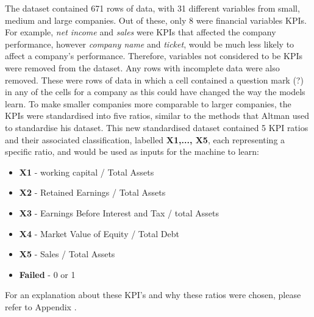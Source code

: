 \documentclass[11pt]{article}
\begin{document}
The dataset contained 671 rows of data, with 31 different variables from small, medium and large companies. Out of these, only 8 were financial variables KPIs. For example, \textit{net income} and \textit{sales} were KPIs that affected the company performance, however \textit{company name} and \textit{ticket}, would be much less likely to affect a company's performance. Therefore, variables not considered to be KPIs were removed from the dataset. Any rows with incomplete data were also removed. These were rows of data in which a cell contained a question mark (?) in any of the cells for a company as this could have changed the way the models learn. To make smaller companies more comparable to larger companies, the KPIs were standardised into five ratios, similar to the methods that Altman used to standardise his dataset. This new standardised dataset contained 5 KPI ratios and their associated classification, labelled \textbf{X1,..., X5}, each representing a specific ratio, and would be used as inputs for the machine to learn:
\begin{center}
	\begin{minipage}{.6\textwidth}
		\begin{itemize}
			\item[] \textbf{X1} - working capital / Total Assets
			\item[] \textbf{X2} - Retained Earnings / Total Assets
			\item[] \textbf{X3} - Earnings Before Interest and Tax / total Assets
			\item[] \textbf{X4} - Market Value of Equity / Total Debt
			\item[] \textbf{X5} - Sales / Total Assets
			\item[] \textbf{Failed} - 0 or 1
		\end{itemize}
	\end{minipage}
\end{center}
For an explanation about these KPI's and why these ratios were chosen, please refer to Appendix \cite{?}.
\end{document}
